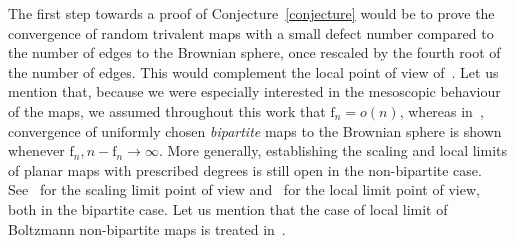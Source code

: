\documentclass[10pt]{amsart}
\theoremstyle{plain}
\theoremstyle{definition}
\theoremstyle{remark}
\newcommand{\face}{\mathrm{f}}
\begin{document}
The first step towards a proof of Conjecture~\ref{conjecture} would be to prove the convergence of random trivalent maps with a small defect number compared to the number of edges to the Brownian sphere, once rescaled by the fourth root of the number of edges. This would complement the local point of view of~\cite{Bud21}.
Let us mention that, because we were especially interested in the mesoscopic behaviour of the maps, we assumed throughout this work that $\face_n = o(n)$, whereas in~\cite{KM21b}, convergence of uniformly chosen \emph{bipartite} maps to the Brownian sphere is shown whenever $\face_n, n-\face_n \to \infty$. More generally, establishing the scaling and local limits of planar maps with prescribed degrees is still open in the non-bipartite case. See~\cite{Mar22} for the scaling limit point of view and~\cite{BL22} for the local limit point of view, both in the bipartite case. Let us mention that the case of local limit of Boltzmann non-bipartite maps is treated in~\cite{Ste18}.
\end{document}
